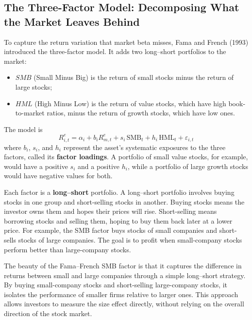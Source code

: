 \subsection{The Three-Factor Model: Decomposing What the Market Leaves Behind}
\label{sec:04-factors}
To capture the return variation that market beta misses, Fama and French (1993) introduced the three-factor model. It adds two long--short portfolios to the market:
\begin{itemize}
  \item $SMB$ (Small Minus Big) is the return of small stocks minus the return of large stocks;
  \item $HML$ (High Minus Low) is the return of value stocks, which have high book-to-market ratios, minus the return of growth stocks, which have low ones.
\end{itemize}
The model is
\begin{equation}
  R^{e}_{i,t} = \alpha_i + b_i R^{e}_{m,t} + s_i \,\mathrm{SMB}_t + h_i \,\mathrm{HML}_t + \varepsilon_{i,t}
  \label{eq:04-ff3}
\end{equation}
where $b_i$, $s_i$, and $h_i$ represent the asset's systematic exposures to the three factors, called its \textbf{factor loadings}. A portfolio of small value stocks, for example, would have a positive $s_i$ and a positive $h_i$, while a portfolio of large growth stocks would have negative values for both.

Each factor is a \textbf{long--short} portfolio. 
A long--short portfolio involves buying stocks in one group and short-selling stocks in another. Buying stocks means the investor owns them and hopes their prices will rise. Short-selling means borrowing stocks and selling them, hoping to buy them back later at a lower price. For example, the SMB factor buys stocks of small companies and short-sells stocks of large companies. The goal is to profit when small-company stocks perform better than large-company stocks.

The beauty of the Fama--French SMB factor is that it captures the difference in returns between small and large companies through a simple long--short strategy. By buying small-company stocks and short-selling large-company stocks, it isolates the performance of smaller firms relative to larger ones. This approach allows investors to measure the size effect directly, without relying on the overall direction of the stock market.

